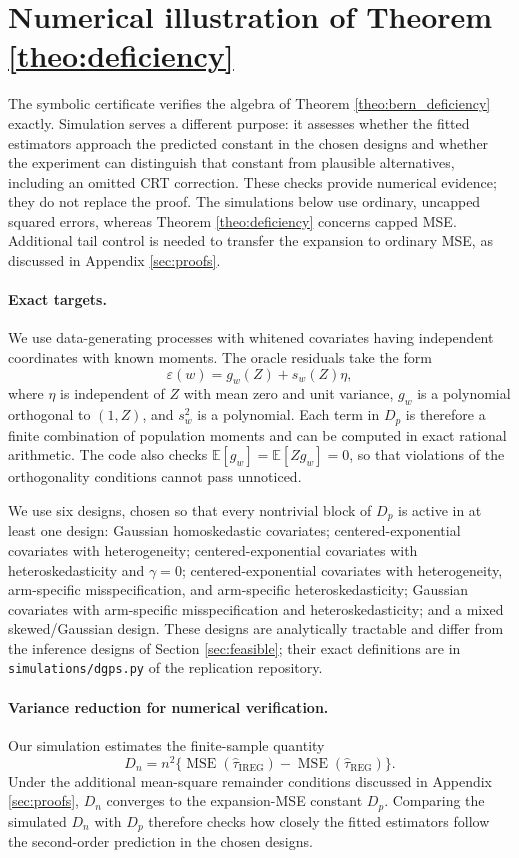 \documentclass{article}
\newcommand{\EEE}{\mathbb{E}}
\newcommand{\htau}{\hat{\tau}}
\DeclareMathOperator{\MSE}{MSE}
\newcommand{\IREG}{\mathrm{IREG}}
\newcommand{\REG}{\mathrm{REG}}
\theoremstyle{plain}
\theoremstyle{definition}
\theoremstyle{remark}
\begin{document}
\section{Numerical illustration of Theorem \ref{theo:deficiency}}
\label{sec:numerical-verification}

The symbolic certificate verifies the algebra of Theorem
\ref{theo:bern_deficiency} exactly. Simulation serves a different
purpose: it assesses whether the fitted estimators approach the
predicted constant in the chosen designs and whether the experiment
can distinguish that constant from plausible alternatives, including
an omitted CRT correction. These checks provide numerical evidence;
they do not replace the proof. The simulations below use ordinary, uncapped squared errors, whereas Theorem \ref{theo:deficiency} concerns capped MSE. Additional tail control is needed to transfer the expansion to ordinary MSE, as discussed in Appendix \ref{sec:proofs}.

\paragraph{Exact targets.}
We use data-generating processes with whitened covariates having
independent coordinates with known moments. The oracle residuals take
the form
\[
\varepsilon(w)=g_w(Z)+s_w(Z)\eta,
\]
where $\eta$ is independent of $Z$ with mean zero and unit variance,
$g_w$ is a polynomial orthogonal to $(1,Z)$, and $s_w^2$ is a polynomial. Each term in $D_p$ is therefore a finite combination of population moments and can be computed in exact rational arithmetic. The code also checks $\EEE[g_w]=\EEE[Zg_w]=0$, so that violations of the orthogonality conditions cannot pass unnoticed.

We use six designs, chosen so that every nontrivial block of $D_p$ is
active in at least one design: Gaussian homoskedastic covariates;
centered-exponential covariates with heterogeneity; centered-exponential covariates with heteroskedasticity and $\gamma=0$; centered-exponential covariates with heterogeneity, arm-specific misspecification, and arm-specific heteroskedasticity; Gaussian covariates with arm-specific misspecification and heteroskedasticity; and a mixed skewed/Gaussian design. These designs are analytically tractable and differ from the inference designs of Section \ref{sec:feasible}; their exact definitions are in \texttt{simulations/dgps.py} of the replication repository.

\paragraph{Variance reduction for numerical verification.}
Our simulation estimates the finite-sample quantity
\[
D_n
=
n^2\{\MSE(\htau_\IREG)-\MSE(\htau_\REG)\}.
\]
Under the additional mean-square remainder conditions discussed in
Appendix \ref{sec:proofs}, $D_n$ converges to the expansion-MSE
constant $D_p$. Comparing the simulated $D_n$ with $D_p$ therefore
checks how closely the fitted estimators follow the second-order
prediction in the chosen designs.
\end{document}
